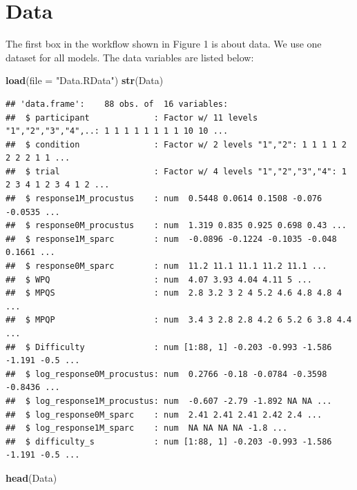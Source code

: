 \documentclass[
]{article}
\newenvironment{Shaded}{\begin{snugshade}}{\end{snugshade}}
\newcommand{\AttributeTok}[1]{\textcolor[rgb]{0.13,0.29,0.53}{#1}}
\newcommand{\FunctionTok}[1]{\textcolor[rgb]{0.13,0.29,0.53}{\textbf{#1}}}
\newcommand{\NormalTok}[1]{#1}
\newcommand{\StringTok}[1]{\textcolor[rgb]{0.31,0.60,0.02}{#1}}
\begin{document}
\hypertarget{data}{%
\section{Data}\label{data}}

The first box in the workflow shown in Figure 1 is about data. We use
one dataset for all models. The data variables are listed below:

\begin{Shaded}
\begin{Highlighting}[]
\FunctionTok{load}\NormalTok{(}\AttributeTok{file =} \StringTok{"Data.RData"}\NormalTok{)}
\FunctionTok{str}\NormalTok{(Data)}
\end{Highlighting}
\end{Shaded}

\begin{verbatim}
## 'data.frame':    88 obs. of  16 variables:
##  $ participant             : Factor w/ 11 levels "1","2","3","4",..: 1 1 1 1 1 1 1 1 10 10 ...
##  $ condition               : Factor w/ 2 levels "1","2": 1 1 1 1 2 2 2 2 1 1 ...
##  $ trial                   : Factor w/ 4 levels "1","2","3","4": 1 2 3 4 1 2 3 4 1 2 ...
##  $ response1M_procustus    : num  0.5448 0.0614 0.1508 -0.076 -0.0535 ...
##  $ response0M_procustus    : num  1.319 0.835 0.925 0.698 0.43 ...
##  $ response1M_sparc        : num  -0.0896 -0.1224 -0.1035 -0.048 0.1661 ...
##  $ response0M_sparc        : num  11.2 11.1 11.1 11.2 11.1 ...
##  $ WPQ                     : num  4.07 3.93 4.04 4.11 5 ...
##  $ MPQS                    : num  2.8 3.2 3 2 4 5.2 4.6 4.8 4.8 4 ...
##  $ MPQP                    : num  3.4 3 2.8 2.8 4.2 6 5.2 6 3.8 4.4 ...
##  $ Difficulty              : num [1:88, 1] -0.203 -0.993 -1.586 -1.191 -0.5 ...
##  $ log_response0M_procustus: num  0.2766 -0.18 -0.0784 -0.3598 -0.8436 ...
##  $ log_response1M_procustus: num  -0.607 -2.79 -1.892 NA NA ...
##  $ log_response0M_sparc    : num  2.41 2.41 2.41 2.42 2.4 ...
##  $ log_response1M_sparc    : num  NA NA NA NA -1.8 ...
##  $ difficulty_s            : num [1:88, 1] -0.203 -0.993 -1.586 -1.191 -0.5 ...
\end{verbatim}

\begin{Shaded}
\begin{Highlighting}[]
\FunctionTok{head}\NormalTok{(Data)}
\end{Highlighting}
\end{Shaded}
\end{document}
